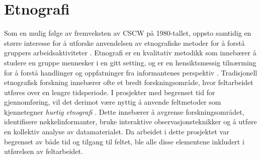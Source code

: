 \section{Etnografi}
\label{section:etnografi} 

Som en mulig følge av fremveksten av CSCW på 1980-tallet, oppsto samtidig en større interesse for å utforske anvendelsen av etnografiske metoder for å forstå gruppers arbeidsaktiviteter  \citep{Blomberg93}. Etnografi er en kvalitativ metodikk som innebærer å studere en gruppe mennesker i en gitt setting, og er en hensiktsmessig tilnærming for å forstå handlinger og oppfatninger fra informantenes perspektiv \citep{Blomberg93, Reeves08, Nardi97}. Tradisjonell etnografisk forskning innebærer ofte et bredt forskningsområde, hvor feltarbeidet utføres over en lengre tidsperiode. I prosjekter med begrenset tid for gjennomføring, vil det derimot være nyttig å anvende feltmetoder som kjennetegner \textit{hurtig etnografi} \citep{Millen00}. Dette innebærer å avgrense forskningsområdet, identifisere nøkkelinformanter, bruke interaktive observasjonsteknikker og å utføre en kollektiv analyse av datamaterialet. Da arbeidet i dette prosjektet var begrenset av både tid og tilgang til feltet, ble alle disse elementene inkludert i utførelsen av feltarbeidet.



